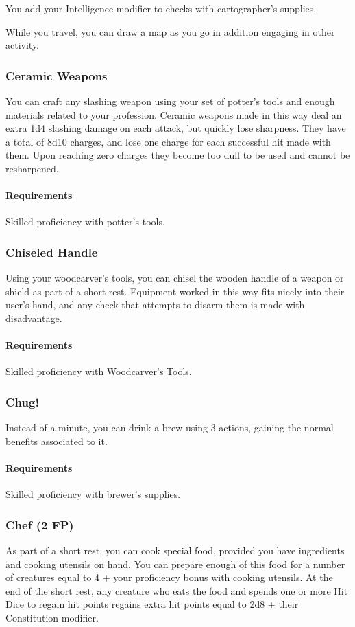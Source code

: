     You add your Intelligence modifier to checks with cartographer's supplies.

    While you travel, you can draw a map as you go in addition engaging in other activity.
\subsubsection{Ceramic Weapons} \label{feat::ceramicweapons}
    You can craft any slashing weapon using your set of potter's tools and enough materials related to your profession.
    Ceramic weapons made in this way deal an extra 1d4 slashing damage on each attack, but quickly lose sharpness.
    They have a total of 8d10 charges, and lose one charge for each successful hit made with them.
    Upon reaching zero charges they become too dull to be used and cannot be resharpened.
    \paragraph{Requirements} Skilled proficiency with potter's tools.
\subsubsection{Chiseled Handle} \label{feat::chiseledhandle}
    Using your woodcarver's tools, you can chisel the wooden handle of a weapon or shield as part of a short rest.
    Equipment worked in this way fits nicely into their user's hand, and any check that attempts to disarm them is made with disadvantage.
    \paragraph{Requirements} Skilled proficiency with Woodcarver's Tools.
\subsubsection{Chug!} \label{feat::chug}
    Instead of a minute, you can drink a brew using 3 actions, gaining the normal benefits associated to it.
    \paragraph{Requirements} Skilled proficiency with brewer's supplies.
\subsubsection{Chef (2 FP)} \label{feat::chef}
    As part of a short rest, you can cook special food, provided you have ingredients and cooking utensils on hand.
    You can prepare enough of this food for a number of creatures equal to 4 + your proficiency bonus with cooking utensils.
    At the end of the short rest, any creature who eats the food and spends one or more Hit Dice to regain hit points regains extra hit points equal to 2d8 + their Constitution modifier.
